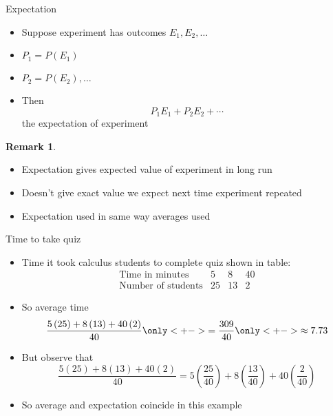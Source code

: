 \documentclass{beamer}
\theoremstyle{definition}
\newtheorem{remark}{Remark}
\begin{document}
\begin{frame}{Expectation}
\begin{definition}
\begin{itemize}
\item Suppose experiment has outcomes $E_1,E_2,\ldots$
\item $P_1=P\left(E_1\right)$
\item $P_2=P\left(E_2\right),\ldots$
\item Then
\[P_1E_1+P_2E_2+\cdots\]
the \alert{expectation} of experiment
\end{itemize}
\end{definition}
\begin{remark}
\begin{itemize}
\item Expectation gives
\alert{expected value} of experiment \alert{in long run}
\item Doesn't give exact value we expect
next time experiment repeated
\item Expectation used in same way averages used
\end{itemize}
\end{remark}
\end{frame}

\begin{frame}{Time to take quiz}
\begin{itemize}
\item Time it took calculus students to complete quiz
shown in table:
\[\begin{array}{r|ccc}
\text{Time in minutes}&5&8&40\\\hline
\text{Number of students}&25&13&2
\end{array}\]
\item So average time
\[\frac{5\left(25\right)+8\left(13\right)+40\left(2\right)}{40}
\only<+->{=\frac{309}{40}}
\only<+->{\approx 7.73}\]
\item But observe that
\[\frac{5\left(25\right)+8\left(13\right)+40\left(2\right)}{40}
=5\left(\frac{25}{40}\right)+8\left(\frac{13}{40}\right)
+40\left(\frac{2}{40}\right)\]
\item So average and expectation coincide in this example
\end{itemize}
\end{frame}
\end{document}

